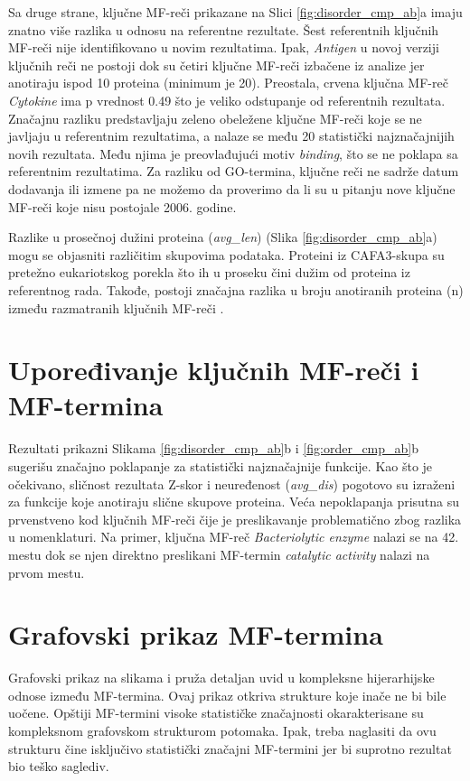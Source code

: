Sa druge strane,  ključne MF-reči  prikazane na
Slici \ref{fig:disorder_cmp_ab}a imaju znatno više razlika u odnosu na
referentne rezultate.  Šest referentnih ključnih MF-reči  nije identifikovano u
novim rezultatima. Ipak, \textit{Antigen} u novoj verziji ključnih reči ne
postoji dok su četiri ključne MF-reči  izbačene iz analize jer anotiraju ispod 10
proteina (minimum je 20).  Preostala, crvena ključna MF-reč 
\textit{Cytokine} ima p vrednost 0.49 što je veliko odstupanje od referentnih
rezultata. Značajnu razliku predstavljaju zeleno obeležene ključne MF-reči  koje
se ne javljaju u referentnim rezultatima, a nalaze se među 20 statistički
najznačajnijih novih rezultata. Među njima je preovlađujući motiv \textit{binding}, 
što se ne poklapa sa referentnim rezultatima. Za razliku od GO-termina,
ključne reči ne sadrže datum dodavanja ili izmene pa ne možemo da proverimo da
li su u pitanju nove ključne MF-reči  koje nisu postojale 2006. godine.

Razlike u prosečnoj dužini proteina (\textit{avg\_len}) (Slika
\ref{fig:disorder_cmp_ab}a) mogu se objasniti različitim skupovima podataka.
Proteini iz CAFA3-skupa su pretežno eukariotskog porekla što ih u proseku čini
dužim od proteina iz referentnog rada. Takođe, postoji značajna razlika u broju
anotiranih proteina (n) između razmatranih ključnih MF-reči .


\section{Upoređivanje ključnih MF-reči  i MF-termina}

Rezultati prikazni Slikama \ref{fig:disorder_cmp_ab}b i
\ref{fig:order_cmp_ab}b sugerišu značajno poklapanje za statistički
najznačajnije funkcije. Kao što je očekivano, sličnost rezultata Z-skor i
neuređenost (\textit{avg\_dis}) pogotovo su izraženi za funkcije koje anotiraju
slične skupove proteina. Veća nepoklapanja prisutna su prvenstveno kod ključnih
MF-reči čije je preslikavanje problematično zbog razlika u nomenklaturi. Na primer,
ključna MF-reč  \textit{Bacteriolytic enzyme} nalazi se na 42. mestu dok se njen
direktno preslikani MF-termin \textit{catalytic activity} nalazi na prvom mestu.

\section{Grafovski prikaz MF-termina}

Grafovski prikaz na slikama  i  pruža
detaljan uvid u kompleksne hijerarhijske odnose između MF-termina. Ovaj prikaz otkriva
strukture koje inače ne bi bile uočene.  Opštiji MF-termini visoke statističke
značajnosti okarakterisane su kompleksnom grafovskom strukturom potomaka. Ipak,
treba naglasiti da ovu strukturu čine isključivo statistički značajni MF-termini
jer bi suprotno rezultat bio  teško saglediv.

